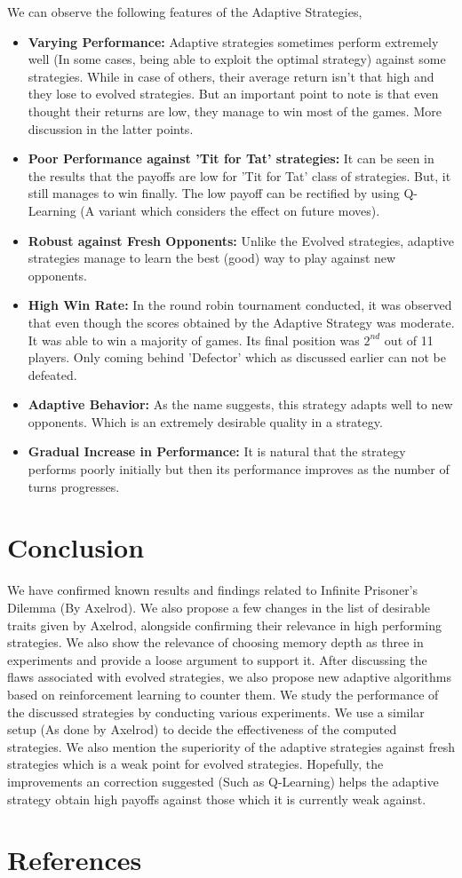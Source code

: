 \documentclass[a4paper]{article}
\begin{document}
	We can observe the following features of the Adaptive Strategies,
	\begin{itemize}
		\item \textbf{Varying Performance:} Adaptive strategies sometimes perform extremely well (In some cases, being able to exploit the optimal strategy) against some strategies. While in case of others, their average return isn't that high and they lose to evolved strategies. But an important point to note is that even thought their returns are low, they manage to win most of the games. More discussion in the latter points.
		\item \textbf{Poor Performance against 'Tit for Tat' strategies:} It can be seen in the results that the payoffs are low for 'Tit for Tat' class of strategies. But, it still manages to win finally. The low payoff can be rectified by using Q-Learning (A variant which considers the effect on future moves).
		\item \textbf{Robust against Fresh Opponents:} Unlike the Evolved strategies, adaptive strategies manage to learn the best (good) way to play against new opponents.
		\item \textbf{High Win Rate:} In the round robin tournament conducted, it was observed that even though the scores obtained by the Adaptive Strategy was moderate. It was able to win a majority of games. Its final position was $2^{nd}$ out of 11 players. Only coming behind 'Defector' which as discussed earlier can not be defeated.	
		\item \textbf{Adaptive Behavior:} As the name suggests, this strategy adapts well to new opponents. Which is an extremely desirable quality in a strategy.
		\item \textbf{Gradual Increase in Performance:} It is natural that the strategy performs poorly initially but then its performance improves as the number of turns progresses.				
	\end{itemize}		
	
	\section{Conclusion}	
			
	We have confirmed known results and findings related to Infinite Prisoner's Dilemma (By Axelrod). We also propose a few changes in the list of desirable traits given by Axelrod, alongside confirming their relevance in high performing strategies. We also show the relevance of choosing memory depth as three in experiments and provide a loose argument to support it. After discussing the flaws associated with evolved strategies, we also propose new adaptive algorithms based on reinforcement learning to counter them. We study the performance of the discussed strategies by conducting various experiments. We use a similar setup (As done by Axelrod) to decide the effectiveness of the computed strategies. We also mention the superiority of the adaptive strategies against fresh strategies which is a weak point for evolved strategies. Hopefully, the improvements an correction suggested (Such as Q-Learning) helps the adaptive strategy obtain high payoffs against those which it is currently weak against.
					
	\section{References}
\end{document}
